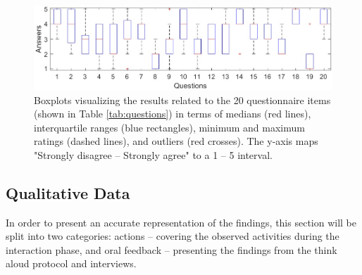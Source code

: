 \begin{figure}[!t]
    \centering
    \includegraphics[width=1.0\textwidth]{figures/Boxplots.jpg}
    \caption{Boxplots visualizing the results related to the 20 questionnaire items (shown in Table \ref{tab:questions}) in terms of medians (red lines), interquartile ranges (blue rectangles), minimum and maximum ratings (dashed lines), and outliers (red crosses). The y-axis maps "Strongly disagree -- Strongly agree" to a 1 -- 5 interval.}
    \label{fig:boxplots}
\end{figure}

\subsection{Qualitative Data}
In order to present an accurate representation of the findings, this section will be split into two categories: actions -- covering the observed activities during the interaction phase, and oral feedback -- presenting the findings from the think aloud protocol and interviews.

